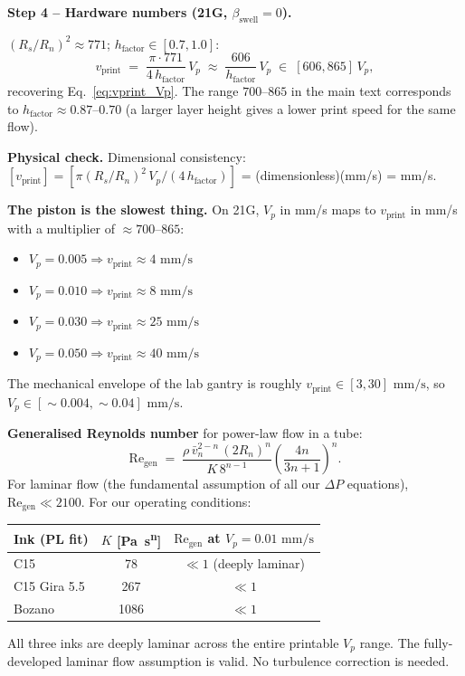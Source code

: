 \documentclass[11pt,a4paper]{article}
\newcommand{\mms}{\,\mathrm{mm/s}}
\newcommand{\Rey}{\mathrm{Re}}
\begin{document}
\begin{derivationbox}[title={DERIVATION --- Volume conservation: $V_p\to v_\mathrm{print}$}]
\noindent\textbf{Step 4 -- Hardware numbers (21G, $\beta_\mathrm{swell}=0$).}

$(R_s/R_n)^2 \approx 771$; $h_\mathrm{factor}\in[0.7, 1.0]$:
\begin{equation*}
v_\mathrm{print}
\;=\; \frac{\pi\cdot 771}{4\,h_\mathrm{factor}}\,V_p
\;\approx\; \frac{606}{h_\mathrm{factor}}\,V_p
\;\in\; [606, 865]\,V_p,
\end{equation*}
recovering Eq.~\ref{eq:vprint_Vp}. The range $700$--$865$ in the main
text corresponds to $h_\mathrm{factor}\approx 0.87$--$0.70$
(a larger layer height gives a lower print speed for the same flow).

\medskip\noindent\textbf{Physical check.} Dimensional consistency:
$[v_\mathrm{print}] = [\pi(R_s/R_n)^2\,V_p / (4\,h_\mathrm{factor})]$
= (dimensionless)(mm/s) = \si{\mm/\s}. \checkmark
\end{derivationbox}

\begin{intuitionbox}
\textbf{The piston is the slowest thing.} On 21G, $V_p$ in \si{\mm/\s}
maps to $v_\mathrm{print}$ in \si{\mm/\s} with a multiplier of
$\approx 700$--$865$:
\begin{itemize}[leftmargin=1.4em,itemsep=1pt]
\item $V_p=0.005 \Rightarrow v_\mathrm{print}\approx 4\,\mms$
\item $V_p=0.010 \Rightarrow v_\mathrm{print}\approx 8\,\mms$
\item $V_p=0.030 \Rightarrow v_\mathrm{print}\approx 25\,\mms$
\item $V_p=0.050 \Rightarrow v_\mathrm{print}\approx 40\,\mms$
\end{itemize}
The mechanical envelope of the lab gantry is roughly
$v_\mathrm{print}\in[3,30]\,\mms$, so $V_p\in[\sim 0.004,\sim 0.04]\,\mms$.
\end{intuitionbox}

\begin{dimensionlessbox}
\textbf{Generalised Reynolds number} for power-law flow in a tube:
\begin{equation}
\Rey_\mathrm{gen} \;=\;
\frac{\rho\,\bar v_n^{2-n}\,(2R_n)^n}{K\,8^{n-1}}
\left(\frac{4n}{3n+1}\right)^n.
\end{equation}
For laminar flow (the fundamental assumption of all our $\Delta P$
equations), $\Rey_\mathrm{gen}\ll 2100$. For our operating conditions:

\medskip\centering
\begin{tabular}{lcc}
\toprule
Ink (PL fit) & $K$ [\si{\Pa\s^n}] & $\Rey_\mathrm{gen}$ at $V_p=0.01\,\mms$ \\
\midrule
C15           & 78   & $\ll 1$ (deeply laminar) \\
C15 Gira 5.5  & 267  & $\ll 1$ \\
Bozano        & 1086 & $\ll 1$ \\
\bottomrule
\end{tabular}
\medskip\flushleft
All three inks are deeply laminar across the entire printable $V_p$
range. The fully-developed laminar flow assumption is valid. No
turbulence correction is needed.
\end{dimensionlessbox}
\end{document}
